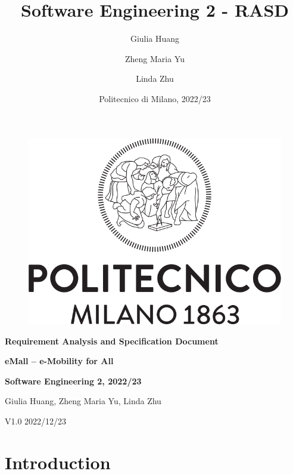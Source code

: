 \documentclass[12pt]{article}
\title{Software Engineering 2 - RASD}
\author{
  Giulia Huang
  \and
  Zheng Maria Yu
  \and
  Linda Zhu
}
\date{Politecnico di Milano, 2022/23}
\begin{document}
\begin{titlepage}
\vspace*{2.7cm}
\begin{figure}[h!]
	\centering
	\includegraphics[scale=0.35]{images/logo.png}
\end{figure}
\vspace{0.7em}
\begin{center}
	\Large \textbf{Requirement Analysis and Specification Document}
\end{center}
\begin{center}
	\Large \textbf{eMall – e-Mobility for All} 
\end{center}
\vspace{0.7em}
\begin{center}
	\textbf{Software Engineering 2, 2022/23}
\end{center}
\vspace{0.7em}
\begin{center}
	\normalsize Giulia Huang, Zheng Maria Yu, Linda Zhu
\end{center}
\vspace{6em}
\begin{center}
	\normalsize V1.0 2022/12/23
\end{center}
\vspace*{\fill}
\end{titlepage}

\normalsize


\newpage
\tableofcontents
\newpage

\section{Introduction}

\end{document}
